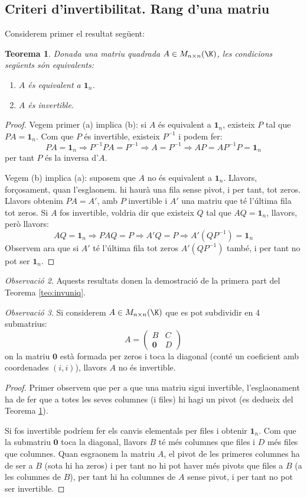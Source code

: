 \documentclass[a4paper,12pt,twoside]{article}
\newcommand{\1}{\mathbf{1}}
\newcommand{\0}{\mathbf{0}}
\newtheorem{teorema}{Teorema}[section]
\theoremstyle{definition}
\theoremstyle{remark}
\newtheorem{observacio}[teorema]{Observació}
\begin{document}
\subsection{Criteri d'invertibilitat. Rang d'una matriu}
Considerem primer el resultat següent:
\begin{teorema}\label{teo:critinv}
	Donada una matriu quadrada $A \in M_{n\times n}(\K)$, les condicions següents són equivalents:
	\begin{enumerate}[\rm (a)]
		\item $A$ és equivalent a $\1_n$.
		\item $A$ és invertible.
	\end{enumerate}
\end{teorema}
\begin{proof}
Vegem primer (a) implica (b): si $A$ és equivalent a $\1_n$, existeix $P$ tal que $PA=\1_n$. Com que $P$ és invertible, existeix $P^{-1}$ i podem fer:
$$PA=\1_n \Rightarrow P ^{-1}PA=P^{-1} \Rightarrow A=P^{-1} \Rightarrow AP=AP^{-1}P=\1_n$$
per tant $P$ és la inversa d'$A$.

Vegem (b) implica (a): suposem que $A$ no és equivalent a $\1_n$. Llavors, forçosament, quan l'esglaonem. hi haurà una fila sense pivot, i per tant, tot zeros. Llavors obtenim $PA=A'$, amb $P$ invertible i $A'$ una matriu que té l'última fila tot zeros. Si $A$ fos invertible, voldria dir que existeix $Q$ tal que $AQ=\1_n$, llavors, però llavors:
$$
AQ=\1_n \Rightarrow PAQ=P \Rightarrow A'Q=P \Rightarrow A'(QP^{-1})=\1_n
$$
Observem ara que si $A'$ té l'última fila tot zeros $A'(QP^{-1})$ també, i per tant no pot ser $\1_n$.
\end{proof}
\begin{observacio}\label{obs:invuniq}
	Aquests resultats donen la demostració de la primera part del Teorema \ref{teo:invuniq}.
\end{observacio}
\begin{observacio}\label{obs:noinv}
	Si considerem $A \in M_{n\times n}(\K)$ que es pot subdividir en 4 submatrius:
	$$
	A=\left(\begin{array}{c|c}
	B & C \\ \hline \0 & D
	\end{array}\right)
	$$ 
	on la matriu $\0$ està formada per zeros i toca la diagonal (conté un coeficient amb coordenades $(i,i)$), llavors $A$ no és invertible.
\end{observacio}
\begin{proof}
	Primer observem que per a que una matriu sigui invertible, l'esglaonament ha de fer que a totes les seves columnes (i files) hi hagi un pivot (es dedueix del Teorema \ref{teo:critinv}).
	
	Si fos invertible podríem fer els canvis elementals per files i obtenir $\1_n$. Com que la submatriu $\0$ toca la diagonal, llavors $B$ té més columnes que files i $D$ més files que columnes. Quan esgraonem la matriu $A$, el pivot de les primeres columnes ha de ser a $B$ (sota hi ha zeros) i per tant no hi pot haver més pivots que files a $B$ (a les columnes de $B$), per tant hi ha columnes de $A$ sense pivot, i per tant no pot ser invertible.
\end{proof}
\end{document}
